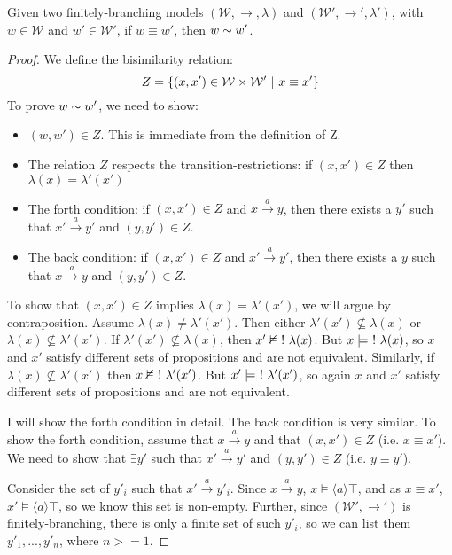\begin{case}
Given two finitely-branching models $(\mathcal{W}, \rightarrow,
\lambda)$ and $(\mathcal{W}', \rightarrow', \lambda')$, with $w \in
\mathcal{W}$ and $w' \in \mathcal{W}'$, if $w \equiv w'$, then $w
\sim w'$.
\end{case}
\begin{proof}
We define the bisimilarity relation:
\[
Z = \{(x,x') \in \mathcal{W} \times \mathcal{W}' \ | \  x \equiv x' \}
\]
To prove $w \sim w'$, we need to show:
\begin{itemize}

\item $(w,w') \in Z$. This is immediate from the definition of Z.

\item The relation $Z$ respects the transition-restrictions: if
  $(x,x') \in Z$ then $\lambda(x) = \lambda'(x')$

\item The forth condition: if $(x,x') \in Z$ and $x \xrightarrow{a}
  y$, then there exists a $y'$ such that $x' \xrightarrow{a} y'$ and $(y, y') \in Z$.

\item The back condition: if $(x,x') \in Z$ and $x' \xrightarrow{a}
  y'$, then there exists a $y$ such that $x \xrightarrow{a} y$ and $(y, y') \in Z$.

\end{itemize}
To show that $(x,x') \in Z$ implies $\lambda(x) = \lambda'(x')$, we will argue by contraposition.
Assume $\lambda(x) \neq \lambda'(x')$.
Then either $\lambda'(x') \nsubseteq  \lambda(x)$ or $\lambda(x) \nsubseteq  \lambda'(x')$.
If $\lambda'(x') \nsubseteq  \lambda(x)$, then $x' \nvDash \ ! \  \lambda(x)$.
But $x \models \ ! \  \lambda(x)$, so $x$ and $x'$ satisfy different sets of propositions and are not equivalent.
Similarly, if $\lambda(x) \nsubseteq  \lambda'(x')$ then $x \nvDash \ ! \  \lambda'(x')$.
But $x' \models \ ! \  \lambda'(x')$, so again $x$ and $x'$ satisfy different sets of propositions and are not equivalent.

I will show the forth condition in detail. The back condition is very similar.
To show the forth condition, assume that  $x \xrightarrow{a} y$ and that $(x,x') \in Z$ (i.e. $x \equiv x'$).
We need to show that $\exists y'$ such that $x' \xrightarrow{a} y'$ and $(y,y') \in Z$ (i.e. $y \equiv y'$).

Consider the set of $y'_i$ such that $x' \xrightarrow{a} y'_i$. Since $x \xrightarrow{a} y$, $x \models \langle a \rangle \top$, and as $x \equiv x'$,  $x' \models \langle a \rangle \top$, so we know this set is non-empty.
Further, since $(\mathcal{W}', \rightarrow')$ is finitely-branching, there is only a finite set of such $y'_i$, so we can list them $y'_1, ..., y'_n$,  where $n >= 1$.


\end{proof}
